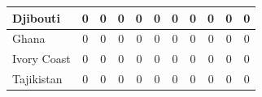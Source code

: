 \documentclass[12pt]{article}  %
\begin{document}
\begin{subappendices}
\begin{longtable}{|l|c|c|c|c|c|c|c|c|c|c|}
	\hline
	Djibouti                                                       & 0                                                                      & 0                                                                      & 0                                                                      & 0                                                                      & 0                                                                      & 0                                                                      & 0                         & 0                           & 0                           & 0                           \\ 
	\hline
	Ghana                                                          & 0                                                                      & 0                                                                      & 0                                                                      & 0                                                                      & 0                                                                      & 0                                                                      & 0                         & 0                           & 0                           & 0                           \\ 
	\hline
	Ivory Coast                                                    & 0                                                                      & 0                                                                      & 0                                                                      & 0                                                                      & 0                                                                      & 0                                                                      & 0                         & 0                           & 0                           & 0                           \\ 
	\hline
	Tajikistan                                                     & 0                                                                      & 0                                                                      & 0                                                                      & 0                                                                      & 0                                                                      & 0                                                                      & 0                         & 0                           & 0                           & 0                           \\ 

\end{longtable}
\end{subappendices}
\end{document}

